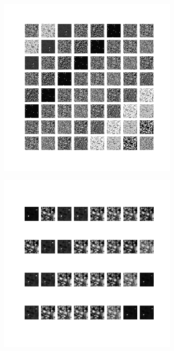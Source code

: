 \begin{figure}
    \centering
    \begin{subfigure}[b]{0.40\linewidth}
        \includegraphics[width=\linewidth]{images/cae_online_lstm/caelstm_section_cae_training_uniform_random_fill_10000_model_feature_maps_map_0_0_3.png}
    \end{subfigure}
    \hfill
    \begin{subfigure}[b]{0.40\linewidth}
        \includegraphics[width=\linewidth]{images/cae_online_lstm/caelstm_section_cae_training_uniform_random_fill_10000_model_feature_maps_map_0_0_2.png}

\end{subfigure}
\end{figure}
